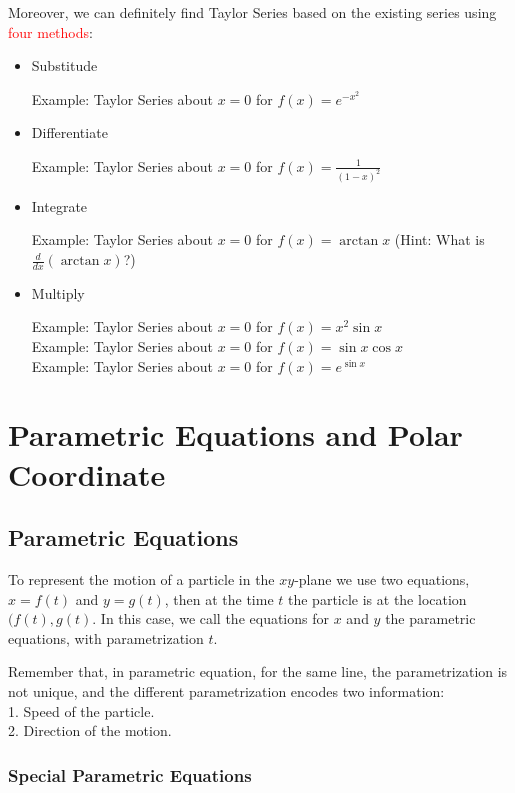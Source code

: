 \documentclass[12pt]{article}
\theoremstyle{definition}
\theoremstyle{definition}
\theoremstyle{remark}
\theoremstyle{definition}
\theoremstyle{definition}
\theoremstyle{definition}
\begin{document}
Moreover, we can definitely find Taylor Series based on the existing series using \textcolor{red}{four methods}:
\begin{itemize}
	\item Substitude
	
Example: Taylor Series about $x=0$ for $f(x)=e^{-x^2}$	
	
	\item Differentiate 
	
Example: Taylor Series about $x=0$ for $f(x)=\frac{1}{(1-x)^2}$	

	\item Integrate
	
Example: Taylor Series about $x=0$ for $f(x)=\arctan x$ (Hint: What is $\frac{d}{dx}(\arctan x)$?)			
	\item Multiply
	
	Example: Taylor Series about $x=0$ for $f(x)=x^2 \sin x$\\
	Example: Taylor Series about $x=0$ for $f(x)=\sin x \cos x$\\
	Example: Taylor Series about $x=0$ for $f(x)=e^{\sin x}$\\

\end{itemize}

\section{Parametric Equations and Polar Coordinate}
\subsection{Parametric Equations}
To represent the motion of a particle in the $xy$-plane we use two equations, $x=f(t)$ and $y=g(t)$, then at the time $t$ the particle is at the location $(f(t),g(t)$. In this case, we call the equations for $x$ and $y$ the parametric equations, with parametrization $t$.

Remember that, in parametric equation, for the same line, the parametrization is not unique, and the different parametrization encodes two information:\\
1. Speed of the particle.\\
2. Direction of the motion.\\

\subsubsection{Special Parametric Equations}
\end{document}
